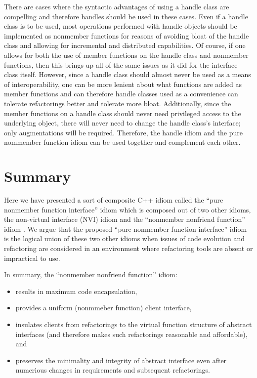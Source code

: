 \documentclass[pdf,ps2pdf,11pt]{SANDreport}
\begin{document}
There are cases where the syntactic advantages of using a handle class are
compelling and therefore handles should be used in these cases.  Even if a
handle class is to be used, most operations performed with handle objects
should be implemented as nonmember functions for reasons of avoiding bloat of
the handle class and allowing for incremental and distributed capabilities.
Of course, if one allows for both the use of member functions on the handle
class and nonmember functions, then this brings up all of the same issues as
it did for the interface class itself.  However, since a handle class should
almost never be used as a means of interoperability, one can be more lenient
about what functions are added as member functions and can therefore handle
classes used as a convenience can tolerate refactorings better and tolerate
more bloat.  Additionally, since the member functions on a handle class should
never need privileged access to the underlying object, there will never need
to change the handle class's interface; only augmentations will be required.
Therefore, the handle idiom and the pure nommember function idiom can be used
together and complement each other.

%
\section{Summary}
%

Here we have presented a sort of composite C++ idiom called the ``pure
nonmember function interface'' idiom which is composed out of two other
idioms, the non-virtual interface (NVI) idiom {}\cite[Item
39]{C++CodingStandards05} and the ``nonmember nonfriend function'' idiom
{}\cite[Item 44]{C++CodingStandards05}.  We argue that the proposed ``pure
nonmember function interface'' idiom is the logical union of these two other
idioms when issues of code evolution and refactoring are considered in an
environment where refactoring tools are absent or impractical to use.

In summary, the ``nonmember nonfriend function'' idiom:

\begin{itemize}

{}\item results in maximum code encapsulation,

{}\item provides a uniform (nonmmeber function) client interface,

{}\item insulates clients from refactorings to the virtual function structure
of abstract interfaces (and therefore makes such refactorings reasonable and
affordable), and

{}\item preserves the minimality and integrity of abstract interface even
after numerious changes in requirements and subsequent refactorings.

\end{itemize}
\end{document}

